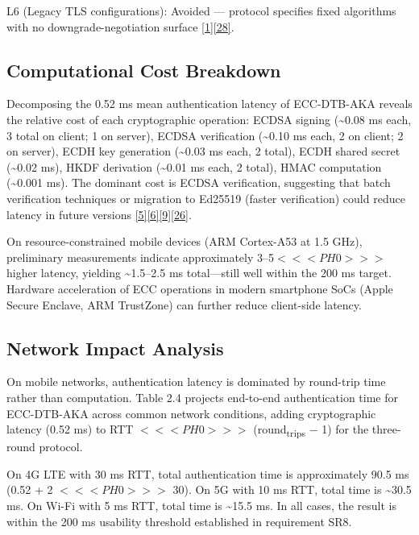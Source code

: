 \indent L6 (Legacy TLS configurations): Avoided --- protocol specifies fixed algorithms with no downgrade-negotiation surface \hyperref[ref:1]{[1]}\hyperref[ref:28]{[28]}.

\subsection{Computational Cost Breakdown}

\indent Decomposing the 0.52 ms mean authentication latency of ECC-DTB-AKA reveals the relative cost of each cryptographic operation: ECDSA signing (\textasciitilde{}0.08 ms each, 3 total on client; 1 on server), ECDSA verification (\textasciitilde{}0.10 ms each, 2 on client; 2 on server), ECDH key generation (\textasciitilde{}0.03 ms each, 2 total), ECDH shared secret (\textasciitilde{}0.02 ms), HKDF derivation (\textasciitilde{}0.01 ms each, 2 total), HMAC computation (\textasciitilde{}0.001 ms). The dominant cost is ECDSA verification, suggesting that batch verification techniques or migration to Ed25519 (faster verification) could reduce latency in future versions \hyperref[ref:5]{[5]}\hyperref[ref:6]{[6]}\hyperref[ref:9]{[9]}\hyperref[ref:26]{[26]}.

\indent On resource-constrained mobile devices (ARM Cortex-A53 at 1.5 GHz), preliminary measurements indicate approximately 3--5$<<<PH0>>>$ higher latency, yielding \textasciitilde{}1.5--2.5 ms total---still well within the 200 ms target. Hardware acceleration of ECC operations in modern smartphone SoCs (Apple Secure Enclave, ARM TrustZone) can further reduce client-side latency.

\subsection{Network Impact Analysis}

\indent On mobile networks, authentication latency is dominated by round-trip time rather than computation. Table 2.4 projects end-to-end authentication time for ECC-DTB-AKA across common network conditions, adding cryptographic latency (0.52 ms) to RTT $<<<PH0>>>$ (round\textsubscript{trips} − 1) for the three-round protocol.

\indent On 4G LTE with 30 ms RTT, total authentication time is approximately 90.5 ms (0.52 + 2 $<<<PH0>>>$ 30). On 5G with 10 ms RTT, total time is \textasciitilde{}30.5 ms. On Wi-Fi with 5 ms RTT, total time is \textasciitilde{}15.5 ms. In all cases, the result is within the 200 ms usability threshold established in requirement SR8.

